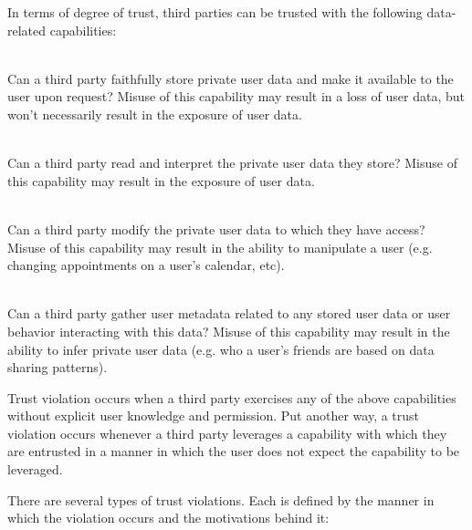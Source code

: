 In terms of degree of trust, third parties can be trusted with the
following data-related capabilities:

\begin{packed_desc}
\item[Storage (S):] \hfill \\ Can a third party faithfully store
  private user data and make it available to the user upon request?
  Misuse of this capability may result in a loss of user data, but
  won't necessarily result in the exposure of user data.
\item[Access (R):] \hfill \\ Can a third party read and interpret the
  private user data they store? Misuse of this capability may result
  in the exposure of user data.
\item[Manipulation (W):] \hfill \\ Can a third party modify the
  private user data to which they have access? Misuse of this
  capability may result in the ability to manipulate a user
  (e.g. changing appointments on a user's calendar, etc).
\item[Meta-analysis (M):] \hfill \\ Can a third party gather user
  metadata related to any stored user data or user behavior
  interacting with this data? Misuse of this capability may result in
  the ability to infer private user data (e.g. who a user's friends
  are based on data sharing patterns).
\end{packed_desc}

Trust violation occurs when a third party exercises any of the above
capabilities without explicit user knowledge and permission. Put
another way, a trust violation occurs whenever a third party leverages
a capability with which they are entrusted in a manner in which the
user does not expect the capability to be leveraged.

There are several types of trust violations. Each is defined by the
manner in which the violation occurs and the motivations behind it:

